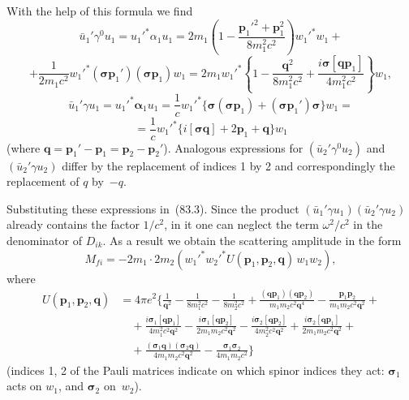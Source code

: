 With the help of this formula we find
\[
\bar{u}_1'\gamma^0 u_1 = u_1'^*\alpha_1 u_1 = 2m_1\left(1-\frac{\mathbf{p}_1'^2+\mathbf{p}_1^2}{8m_1^2c^2}\right)w_1'^*w_1 +
\]
\[
+\frac{1}{2m_1c^2}w_1'^*(\boldsymbol{\sigma}\mathbf{p}_1')(\boldsymbol{\sigma}\mathbf{p}_1)w_1 = 2m_1 w_1'^*\left\{1-\frac{\mathbf{q}^2}{8m_1^2c^2}+\frac{i\boldsymbol{\sigma}[\mathbf{q}\mathbf{p}_1]}{4m_1^2c^2}\right\}w_1,
\]
\[
\bar{u}_1'\gamma u_1 = u_1'^*\boldsymbol{\alpha}_1 u_1 = \frac{1}{c}w_1'^*\{\boldsymbol{\sigma}(\boldsymbol{\sigma}\mathbf{p}_1) + (\boldsymbol{\sigma}\mathbf{p}_1')\boldsymbol{\sigma}\}w_1 =
\]
\[
= \frac{1}{c}w_1'^*\{i[\boldsymbol{\sigma}\mathbf{q}] + 2\mathbf{p}_1 + \mathbf{q}\}w_1
\]
(where $\mathbf{q} = \mathbf{p}_1' - \mathbf{p}_1 = \mathbf{p}_2 - \mathbf{p}_2'$). Analogous expressions for $(\bar{u}_2'\gamma^0 u_2)$ and $(\bar{u}_2'\gamma u_2)$ differ by the replacement of indices 1 by 2 and correspondingly the replacement of $q$ by~$-q$.

Substituting these expressions in~(83.3). Since the product $(\bar{u}_1'\gamma u_1)(\bar{u}_2'\gamma u_2)$ already contains the factor $1/c^2$, in it one can neglect the term $\omega^2/c^2$ in the denominator of $D_{ik}$. As a result we obtain the scattering amplitude in the form
\begin{equation}
M_{fi} = -2m_1\cdot 2m_2(w_1'^*w_2'^*U(\mathbf{p}_1, \mathbf{p}_2, \mathbf{q})\,w_1 w_2),
\tag{83.8}
\end{equation}
where
\begin{equation}
\begin{split}
U(\mathbf{p}_1, \mathbf{p}_2, \mathbf{q}) &= 4\pi e^2\bigg\{\frac{1}{\mathbf{q}^2} - \frac{1}{8m_1^2c^2} - \frac{1}{8m_2^2c^2} + \frac{(\mathbf{q}\mathbf{p}_1)(\mathbf{q}\mathbf{p}_2)}{m_1 m_2 c^2\mathbf{q}^4} - \frac{\mathbf{p}_1\mathbf{p}_2}{m_1 m_2 c^2\mathbf{q}^2}+{}\\
&\quad +\frac{i\boldsymbol{\sigma}_1[\mathbf{q}\mathbf{p}_1]}{4m_1^2c^2\mathbf{q}^2} - \frac{i\boldsymbol{\sigma}_1[\mathbf{q}\mathbf{p}_2]}{2m_1 m_2 c^2\mathbf{q}^2} - \frac{i\boldsymbol{\sigma}_2[\mathbf{q}\mathbf{p}_2]}{4m_2^2c^2\mathbf{q}^2} + \frac{i\boldsymbol{\sigma}_2[\mathbf{q}\mathbf{p}_1]}{2m_1 m_2 c^2\mathbf{q}^2}+{}\\
&\quad +\frac{(\boldsymbol{\sigma}_1\mathbf{q})(\boldsymbol{\sigma}_2\mathbf{q})}{4m_1 m_2 c^2\mathbf{q}^2} - \frac{\boldsymbol{\sigma}_1\boldsymbol{\sigma}_2}{4m_1 m_2 c^2}\bigg\}
\end{split}
\tag{83.9}
\end{equation}
(indices 1, 2 of the Pauli matrices indicate on which spinor indices they act: $\boldsymbol{\sigma}_1$ acts on $w_1$, and $\boldsymbol{\sigma}_2$ on~$w_2$).

